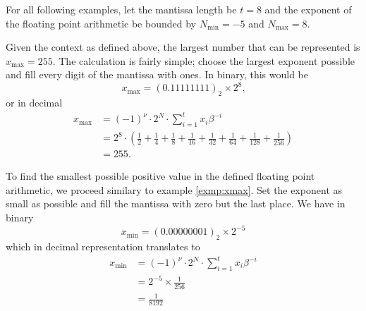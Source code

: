 For all following examples, let the mantissa length be \(t = 8\) and the exponent of the floating point arithmetic be bounded by \(N_{\text{min}} = -5\) and \(N_{\text{max}} = 8\).
%
\begin{exmp} \label{exmp:xmax}
    Given the context as defined above, the largest number that can be represented is \(x_\text{max} = 255\). The calculation is fairly simple; choose the largest exponent possible and fill every digit of the mantissa with ones. In binary, this would be
    \begin{equation*}
        x_\text{max} = (0.11111111)_2 \times 2^8 \text{,}
    \end{equation*}
    or in decimal
    \begin{align*}
        x_\text{max} &= (-1)^{\nu} \cdot 2^N \cdot \sum_{i=1}^{t}x_i \beta^{-i}\\
        &= 2^8 \cdot \left(\frac{1}{2} + \frac{1}{4} + \frac{1}{8} + \frac{1}{16} + \frac{1}{32} + \frac{1}{64} + \frac{1}{128} + \frac{1}{256}\right) \\
        &= 255 \text{.}
    \end{align*}
\end{exmp}
\begin{exmp}
    To find the smallest possible positive value in the defined floating point arithmetic, we proceed similary to example \ref{exmp:xmax}. Set the exponent as small as possible and fill the mantissa with zero but the last place. We have in binary
    \begin{equation*}
        x_\text{min} = (0.00000001)_2 \times 2^{-5}
    \end{equation*}
    which in decimal representation translates to
    \begin{align*}
        x_\text{min} &= (-1)^{\nu} \cdot 2^N \cdot \sum_{i=1}^{t}x_i \beta^{-i} \\
        &= 2^{-5} \times \frac{1}{256} \\
        &= \frac{1}{8192}
    \end{align*}
\end{exmp}





